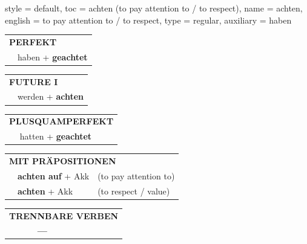 \begin{verbentry}{
  style = {default},
  toc = {achten (to pay attention to / to respect)},
  name = {achten},
  english = {to pay attention to / to respect},
  type = {regular},
  auxiliary = {haben}
}
    \vspace{10pt}

 \begin{tabular}{rl}
     \multicolumn{2}{l}{\textbf{PERFEKT}}\\
   & haben + \textbf{geachtet}\\
  \end{tabular}
\hfill
   \begin{tabular}{rl}
   
    \multicolumn{2}{l}{\textbf{FUTURE I} }\\
   & werden + \textbf{achten}\\
 
  \end{tabular}
\hfill
   \begin{tabular}{rl}
      \multicolumn{2}{l}{\textbf{PLUSQUAMPERFEKT}}\\
   & hatten + \textbf{geachtet}\\
  \end{tabular}

   \vspace{10pt}

   \begin{tabular}{lll}
      \multicolumn{3}{l}{\textbf{MIT PRÄPOSITIONEN}}\\
& \textbf{achten auf} + Akk & (to pay attention to)\\
& \textbf{achten} + Akk & (to respect / value)\\
\end{tabular}
  \hfill
   \begin{tabular}{lll}
\multicolumn{3}{l}{\textbf{TRENNBARE VERBEN}}\\
& \textbf{---} & \\
\end{tabular}


  \vspace{-5pt}
\end{verbentry}

